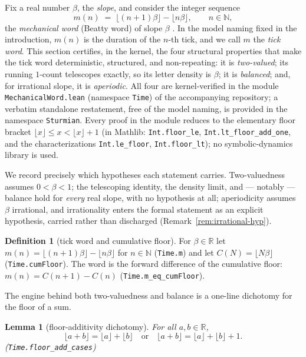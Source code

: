 \documentclass[11pt]{amsart}
\theoremstyle{plain}
\newtheorem{lemma}[theorem]{Lemma}
\theoremstyle{definition}
\newtheorem{definition}[theorem]{Definition}
\theoremstyle{remark}
\begin{document}
Fix a real number $\beta$, the \emph{slope}, and consider the integer sequence
\[
  m(n) \;=\; \lfloor (n+1)\beta \rfloor - \lfloor n\beta \rfloor, \qquad n \in \mathbb{N},
\]
the \emph{mechanical word} (Beatty word) of slope $\beta$ \cite[Ch.~2]{lothaire2002}. In the model naming fixed in the introduction, $m(n)$ is the duration of the $n$-th tick, and we call $m$ the \emph{tick word}. This section certifies, in the kernel, the four structural properties that make the tick word deterministic, structured, and non-repeating: it is \emph{two-valued}; its running $1$-count telescopes exactly, so its letter density is $\beta$; it is \emph{balanced}; and, for irrational slope, it is \emph{aperiodic}. All four are kernel-verified in the module \texttt{MechanicalWord.lean} (namespace \texttt{Time}) of the accompanying repository; a verbatim standalone restatement, free of the model naming, is provided in the namespace \texttt{Sturmian}. Every proof in the module reduces to the elementary floor bracket $\lfloor x \rfloor \le x < \lfloor x \rfloor + 1$ (in Mathlib: \texttt{Int.floor\_le}, \texttt{Int.lt\_floor\_add\_one}, and the characterizations \texttt{Int.le\_floor}, \texttt{Int.floor\_lt}); no symbolic-dynamics library is used.

We record precisely which hypotheses each statement carries. Two-valuedness assumes $0 < \beta < 1$; the telescoping identity, the density limit, and --- notably --- balance hold for \emph{every} real slope, with no hypothesis at all; aperiodicity assumes $\beta$ irrational, and irrationality enters the formal statement as an explicit hypothesis, carried rather than discharged (Remark~\ref{rem:irrational-hyp}).

\begin{definition}[tick word and cumulative floor]\label{def:tickword}
For $\beta \in \mathbb{R}$ let $m(n) = \lfloor (n+1)\beta \rfloor - \lfloor n\beta \rfloor$ for $n \in \mathbb{N}$ (\texttt{Time.m}) and let $C(N) = \lfloor N\beta \rfloor$ (\texttt{Time.cumFloor}). The word is the forward difference of the cumulative floor: $m(n) = C(n+1) - C(n)$ (\texttt{Time.m\_eq\_cumFloor}).
\end{definition}

The engine behind both two-valuedness and balance is a one-line dichotomy for the floor of a sum.

\begin{lemma}[floor-additivity dichotomy]\label{lem:floor-dichotomy}
For all $a, b \in \mathbb{R}$,
\[
  \lfloor a + b \rfloor = \lfloor a \rfloor + \lfloor b \rfloor
  \quad\text{or}\quad
  \lfloor a + b \rfloor = \lfloor a \rfloor + \lfloor b \rfloor + 1.
\]
(\texttt{Time.floor\_add\_cases})
\end{lemma}
\end{document}
